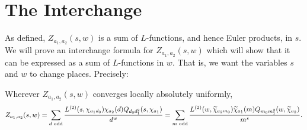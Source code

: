 \documentclass[12pt,reqno,oneside]{amsart}
\begin{document}
\section*{The Interchange}
    As defined, $Z_{a_{1},a_{2}}(s,w)$ is a sum of $L$-functions, and hence Euler products, in $s$. We will prove an interchange formula for $Z_{a_{1},a_{2}}(s,w)$ which will show that it can be expressed as a sum of $L$-functions in $w$. That is, we want the variables $s$ and $w$ to change places. Precisely:

    \begin{theorem}[Interchange]
        Wherever $Z_{a_{1},a_{2}}(s,w)$ converges locally absolutely uniformly,
        \[
            Z_{a_{1},a_{2}}(s,w) = \sum_{\text{$d$ odd}}\frac{L^{(2)}(s,\chi_{a_{1}d_{0}})\chi_{a_{2}}(d)Q_{d_{0}d_{1}^{2}}(s,\chi_{a_{1}})}{d^{w}} = \sum_{\text{$m$ odd}}\frac{L^{(2)}(w,\widetilde{\chi}_{a_{2}m_{0}})\widetilde{\chi}_{a_{1}}(m)Q_{m_{0}m_{1}^{2}}(w,\widetilde{\chi}_{a_{2}})}{m^{s}}.
        \]
    \end{theorem}
\end{document}
